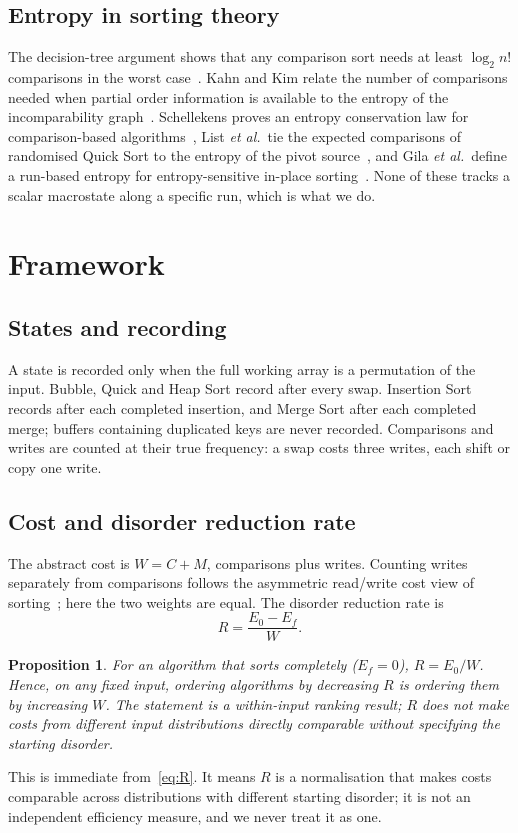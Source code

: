 \documentclass[10pt,journal]{IEEEtran}
\newtheorem{proposition}{Proposition}
\begin{document}
\subsection{Entropy in sorting theory}
The decision-tree argument shows that any comparison sort needs at least $\log_2 n!$ comparisons in the worst case~\cite{ref1,ref8}. Kahn and Kim relate the number of comparisons needed when partial order information is available to the entropy of the incomparability graph~\cite{ref4}. Schellekens proves an entropy conservation law for comparison-based algorithms~\cite{ref6}, List \emph{et al.}\ tie the expected comparisons of randomised Quick Sort to the entropy of the pivot source~\cite{ref7}, and Gila \emph{et al.}\ define a run-based entropy for entropy-sensitive in-place sorting~\cite{ref5}. None of these tracks a scalar macrostate along a specific run, which is what we do.

\section{Framework}
\label{sec:frame}
\subsection{States and recording}
A state is recorded only when the full working array is a permutation of the input. Bubble, Quick and Heap Sort record after every swap. Insertion Sort records after each completed insertion, and Merge Sort after each completed merge; buffers containing duplicated keys are never recorded. Comparisons and writes are counted at their true frequency: a swap costs three writes, each shift or copy one write.

\subsection{Cost and disorder reduction rate}
The abstract cost is $W=C+M$, comparisons plus writes. Counting writes separately from comparisons follows the asymmetric read/write cost view of sorting~\cite{ref19}; here the two weights are equal. The disorder reduction rate is
\begin{equation}
R=\frac{E_0-E_f}{W}.
\label{eq:R}
\end{equation}
\begin{proposition}
\label{prop:R}
For an algorithm that sorts completely ($E_f=0$), $R=E_0/W$. Hence, on any fixed input, ordering algorithms by decreasing $R$ is ordering them by increasing $W$. The statement is a within-input ranking result; $R$ does not make costs from different input distributions directly comparable without specifying the starting disorder.
\end{proposition}
This is immediate from~\eqref{eq:R}. It means $R$ is a normalisation that makes costs comparable across distributions with different starting disorder; it is not an independent efficiency measure, and we never treat it as one.
\end{document}
